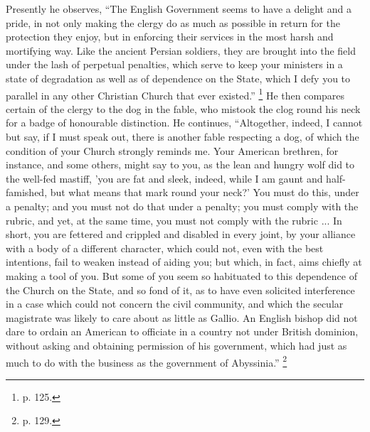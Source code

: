 Presently he observes, ``The English Government seems to have a
delight and a pride, in not only making the clergy do as much as
possible in return for the protection they enjoy, but in enforcing
their services in the most harsh and mortifying way. Like the ancient
Persian soldiers, they are brought into the field under the lash of
perpetual penalties, which serve to keep your ministers in a state of
degradation as well as of dependence on the State, which I defy you to
parallel in any other Christian Church that ever existed.'' \footnote{p. 125.} He then compares certain of the clergy to the dog in the
fable, who mistook the clog round his neck for a badge of honourable
distinction. He continues, ``Altogether, indeed, I cannot but say,
if I must speak out, there is another fable respecting a dog, of which
the condition of your Church strongly reminds me. Your American
brethren, for instance, and some others, might say to you, as the lean
and hungry wolf did to the well-fed mastiff, 'you are fat and sleek,
indeed, while I am gaunt and half-famished, but what means that mark
round your neck?' You must do this, under a penalty; and you must not
do that under a penalty; you must comply with the rubric, and yet, at
the same time, you must not comply with the rubric ... In short, you
are fettered and crippled and disabled in every joint, by your
alliance with a body of a different character, which could not, even
with the best intentions, fail to weaken instead of aiding you; but
which, in fact, aims chiefly at making a tool of you. But some of you
seem so habituated to this dependence of the Church on the State, and
so fond of it, as to have even solicited interference in a case which
could not concern the civil community, and which the secular
magistrate was likely to care about as little as Gallio. An English
bishop did not dare to ordain an American to officiate in a country
not under British dominion, without asking and obtaining permission of
his government, which had just as much to do with the business as the
government of Abyssinia.'' \footnote{p. 129.}

